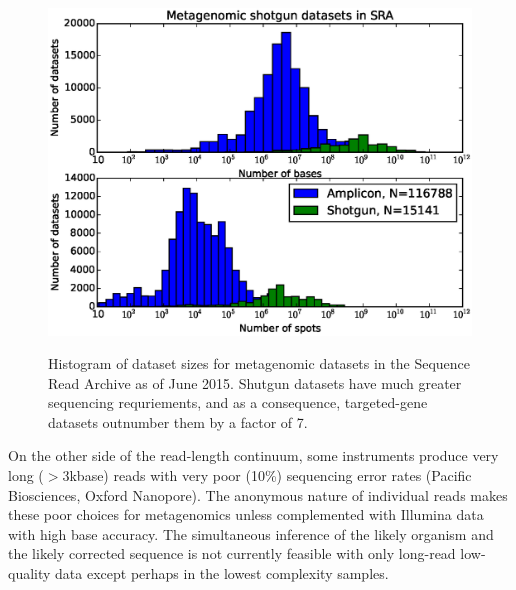 \documentclass[graybox]{svmult}
\begin{document}
\begin{figure}[t]
\caption{Histogram of dataset sizes for metagenomic datasets in the Sequence Read Archive as of June 2015.  Shutgun datasets have much greater sequencing requriements, and as a consequence, targeted-gene  datasets outnumber them by a factor of 7.  }
\includegraphics[width=11.5cm]{imgs/histogram.eps}
%
\label{fig:1}       %
\end{figure}

On the other side of the read-length continuum, some instruments produce very long ($>$3kbase) reads with very poor (10\%) sequencing error rates (Pacific Biosciences, Oxford Nanopore).   The anonymous nature of individual reads makes these poor choices for metagenomics unless complemented with Illumina data with high base accuracy.  The simultaneous inference of the likely organism and the likely corrected sequence is not currently feasible with only long-read low-quality data except perhaps in the lowest complexity samples. 
\end{document}
